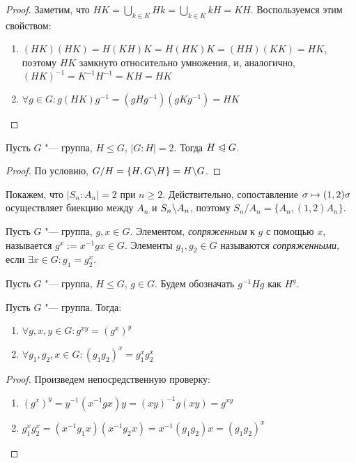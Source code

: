 \begin{proof}
	Заметим, что $HK = \bigcup_{k \in K}Hk = \bigcup_{k \in K}kH = KH$. Воспользуемся этим свойством:
	\begin{enumerate}
		\item $(HK)(HK) = H(KH)K = H(HK)K = (HH)(KK) = HK$, поэтому $HK$ замкнуто относительно умножения, и, аналогично, $(HK)^{-1} = K^{-1}H^{-1} = KH = HK$
		\item $\forall g \in G: g(HK)g^{-1} = (gHg^{-1})(gKg^{-1}) = HK$
	\end{enumerate}
\end{proof}

\begin{proposition}
	Пусть $G$ "--- группа, $H \le G$, $|G : H| = 2$. Тогда $H \trianglelefteqslant G$.
\end{proposition}

\begin{proof}
	По условию, $G / H = \{H, G \backslash H\} = H \backslash G$.
\end{proof}

\begin{note}
	Покажем, что $|S_n : A_n| = 2$ при $n \ge 2$. Действительно, сопоставление $\sigma \hm\mapsto (1, 2)\sigma$ осуществляет биекцию между $A_n$ и $S_n \backslash A_n$, поэтому $S_n / A_n = \{A_n, (1, 2)A_n\}$.
\end{note}

\begin{definition}
	Пусть $G$ "--- группа, $g, x \in G$. Элементом, \textit{сопряженным} к $g$ с помощью $x$, называется $g^x := x^{-1}gx \in G$. Элементы $g_1, g_2 \in G$ называются \textit{сопряженными}, если $\exists x \in G: g_1 = g_2^x$.
\end{definition}

\begin{note}
	Пусть $G$ "--- группа, $H \le G$, $g \in G$. Будем обозначать $g^{-1}Hg$ как $H^g$.
\end{note}

\begin{proposition} Пусть $G$ "--- группа. Тогда:
	\begin{enumerate}
		\item $\forall g, x, y \in G: g^{xy} = (g^x)^y$
		\item $\forall g_1, g_2, x \in G: (g_1g_2)^x = g_1^xg_2^x$
	\end{enumerate}
\end{proposition}

\begin{proof} Произведем непосредственную проверку:
	\begin{enumerate}
		\item $(g^x)^y = y^{-1}(x^{-1}gx)y = (xy)^{-1}g(xy) = g^{xy}$
		\item $g_1^xg_2^x = (x^{-1}g_1x)(x^{-1}g_2x) = x^{-1}(g_1g_2)x = (g_1g_2)^x$
	\end{enumerate}
\end{proof}

